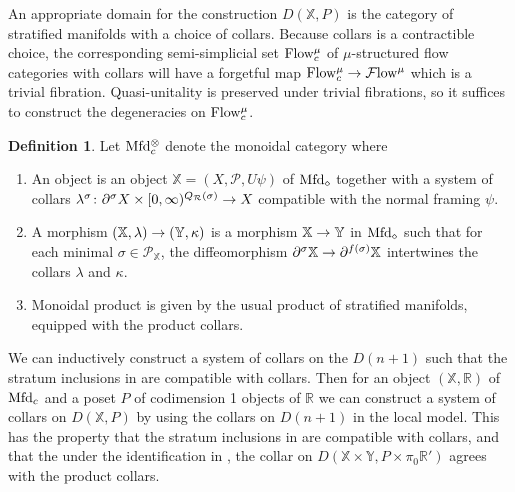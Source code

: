 \documentclass[10pt]{amsart}
\numberwithin{equation}{section}
\theoremstyle{definition}
\newtheorem{definition}[prop]{Definition}
\newcommand{\Flow}{\cF\mathrm{low}\vphantom{w}}
\newcommand{\PreFlow}{\mathrm{Flow}\vphantom{w}}
\newcommand{\Mfd}{\mathrm{Mfd}\vphantom{d}}
\newcommand{\bR}{\mathbb{R}}
\newcommand{\bX}{\mathbb{X}}
\newcommand{\bY}{\mathbb{Y}}
\newcommand{\cP}{\mathcal{P}}
\newcommand{\cR}{\mathcal{R}}
\newcommand{\cF}{\mathcal{F}}
\newcommand{\del}{\partial}
\renewcommand{\to}{\mathchoice{\longrightarrow}{\rightarrow}{}{}}
\begin{document}
An appropriate domain for the construction $D(\bX,P)$ is the category of stratified manifolds with a choice of collars.
Because collars is a contractible choice, the corresponding semi-simplicial set $\PreFlow_{c}^{\mu}$ of $\mu$-structured flow categories with collars will have a forgetful map $\PreFlow^{\mu}_{c}\to \Flow^{\mu}$ which is a trivial fibration.
Quasi-unitality is preserved under trivial fibrations, so it suffices to construct the degeneracies on $\PreFlow^{\mu}_{c}$.

\begin{definition}\label{def:PreMfd_c}
	Let $\Mfd_{c}^{\otimes}$ denote the monoidal category where
	\begin{enumerate}
		\item  An object is an object $\bX=(X,\cP,U\psi)$ of $\Mfd_{\diamond}$ together with a system of collars $\lambda^{\sigma} \colon \del^{\sigma}X \times [0,\infty)^{Q_{\cR}(\sigma)} \to X$ compatible with the normal framing $\psi$.
		\item  A morphism $(\bX,\lambda) \to (\bY, \kappa)$ is a morphism $\bX \to \bY$ in $\Mfd_{\diamond}$ such that for each minimal $\sigma \in \cP_{\bX}$, the diffeomorphism $\del^{\sigma}\bX \to \del^{f(\sigma)}\bX$ intertwines the collars $\lambda$ and $\kappa$.
		\item Monoidal product is given by the usual product of stratified manifolds, equipped with the product collars.
	\end{enumerate}
\end{definition}

We can inductively construct a system of collars on the $D(n+1)$ such that the stratum inclusions in  are compatible with collars.
Then for an object $(\bX,\bR)$ of $\Mfd_{c}$ and a poset $P$ of codimension 1 objects of $\bR$ we can construct a system of collars on $D(\bX,P)$ by using the collars on $D(n+1)$ in the local model.
This has the property that the stratum inclusions in  are compatible with collars, and that the under the identification in , the collar on $D(\bX\times \bY, P\times \pi_{0}\bR')$ agrees with the product collars.
\end{document}
